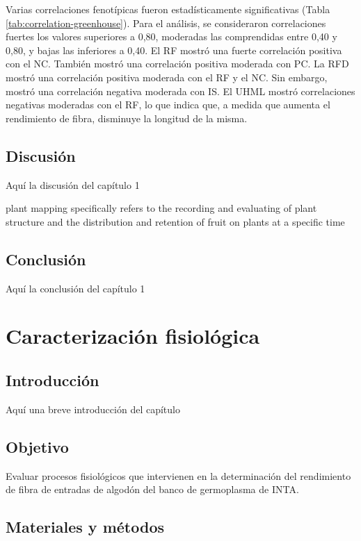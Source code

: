 \documentclass[12pt,oneside]{reedthesis}
\begin{document}
Varias correlaciones fenotípicas fueron estadísticamente significativas (Tabla \ref{tab:correlation-greenhouse}). Para el análisis, se consideraron correlaciones fuertes los valores superiores a 0,80, moderadas las comprendidas entre 0,40 y 0,80, y bajas las inferiores a 0,40. El RF mostró una fuerte correlación positiva con el NC. También mostró una correlación positiva moderada con PC. La RFD mostró una correlación positiva moderada con el RF y el NC. Sin embargo, mostró una correlación negativa moderada con IS. El UHML mostró correlaciones negativas moderadas con el RF, lo que indica que, a medida que aumenta el rendimiento de fibra, disminuye la longitud de la misma.

\section{Discusión}\label{discusiuxf3n}

Aquí la discusión del capítulo 1

plant mapping specifically refers to the recording and evaluating of plant structure and the distribution and retention of fruit on plants at a specific time \autocite{kerby2010}

\section{Conclusión}\label{conclusiuxf3n}

Aquí la conclusión del capítulo 1

\chapter{Caracterización fisiológica}\label{math-sci}

\section{Introducción}\label{introducciuxf3n-2}

Aquí una breve introducción del capítulo

\section{Objetivo}\label{objetivo-1}

Evaluar procesos fisiológicos que intervienen en la determinación del rendimiento de fibra de entradas de algodón del banco de germoplasma de INTA.

\section{Materiales y métodos}\label{materiales-y-muxe9todos-1}
\end{document}

